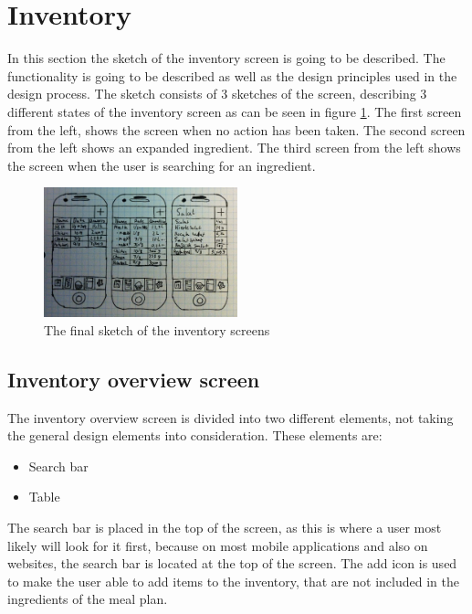 \section{Inventory} \label{InventoryScreen}

In this section the sketch of the inventory screen is going to be described. The functionality is going to be described as well as the design principles used in the design process. The sketch consists of 3 sketches of the screen, describing 3 different states of the inventory screen as can be seen in figure \ref{FinalInventorySketch}. The first screen from the left, shows the screen when no action has been taken. The second screen from the left shows an expanded ingredient. The third screen from the left shows the screen when the user is searching for an ingredient.

\begin{figure}[H]
    \centering
    \includegraphics[width=0.5\textwidth]{Grafik/FoodPlanner/FinalInventorySketch}
    \caption{The final sketch of the inventory screens}
    \label{FinalInventorySketch}
\end{figure}

\subsection{Inventory overview screen}

The inventory overview screen is divided into two different elements, not taking the general design elements into consideration. These elements are:

\begin{itemize}
    \item Search bar
    \item Table
\end{itemize}

The search bar is placed in the top of the screen, as this is where a user most likely will look for it first, because on most mobile applications and also on websites, the search bar is located at the
top of the screen. The add icon is used to make the user able to add items to the inventory, that are not included in the ingredients of the meal plan.

